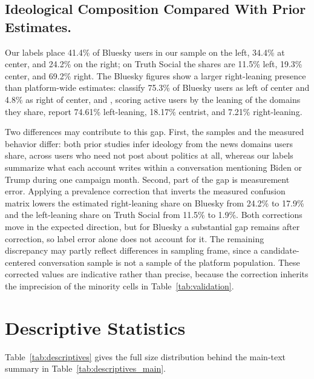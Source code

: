 \documentclass[letterpaper]{article} %
\newcommand{\rev}[1]{{\color{blue}#1}}
\begin{document}
\subsection*{\rev{Ideological Composition Compared With Prior Estimates.}}

\rev{Our labels place 41.4\% of Bluesky users in our sample on the left, 34.4\% at center, and 24.2\% on the right; on Truth Social the shares are 11.5\% left, 19.3\% center, and 69.2\% right. The Bluesky figures show a larger right-leaning presence than platform-wide estimates: \citet{quelle_bluesky_2024} classify 75.3\% of Bluesky users as left of center and 4.8\% as right of center, and \citet{nogara_bluesky_2026}, scoring active users by the leaning of the domains they share, report 74.61\% left-leaning, 18.17\% centrist, and 7.21\% right-leaning.}

\rev{Two differences may contribute to this gap. First, the samples and the measured behavior differ: both prior studies infer ideology from the news domains users share, across users who need not post about politics at all, whereas our labels summarize what each account writes within a conversation mentioning Biden or Trump during one campaign month. Second, part of the gap is measurement error. Applying a prevalence correction that inverts the measured confusion matrix lowers the estimated right-leaning share on Bluesky from 24.2\% to 17.9\% and the left-leaning share on Truth Social from 11.5\% to 1.9\%. Both corrections move in the expected direction, but for Bluesky a substantial gap remains after correction, so label error alone does not account for it. The remaining discrepancy may partly reflect differences in sampling frame, since a candidate-centered conversation sample is not a sample of the platform population. These corrected values are indicative rather than precise, because the correction inherits the imprecision of the minority cells in Table~\ref{tab:validation}.}

\section{\rev{Descriptive Statistics}}

\rev{Table~\ref{tab:descriptives} gives the full size distribution behind the main-text summary in Table~\ref{tab:descriptives_main}.}
\end{document}

